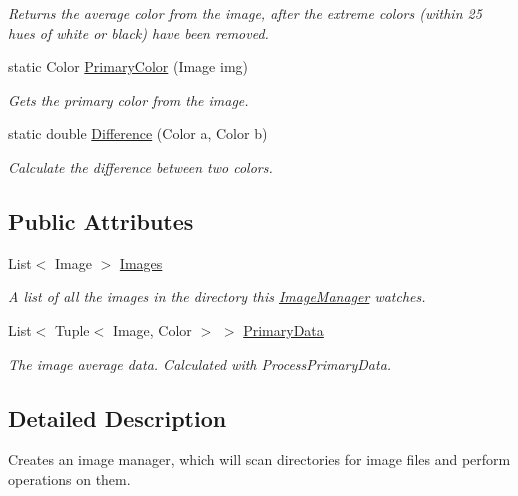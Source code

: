 \begin{DoxyCompactItemize}
\begin{DoxyCompactList}\small\item\em Returns the average color from the image, after the extreme colors (within 25 hues of white or black) have been removed. \end{DoxyCompactList}\item 
static Color \hyperlink{classHumDrum_1_1Operations_1_1ImageManager_acc77118c74c1ff76ba55ffeb0f98121d}{Primary\+Color} (Image img)
\begin{DoxyCompactList}\small\item\em Gets the primary color from the image. \end{DoxyCompactList}\item 
static double \hyperlink{classHumDrum_1_1Operations_1_1ImageManager_a467a48111a335755aac1bf2cc3a7dc55}{Difference} (Color a, Color b)
\begin{DoxyCompactList}\small\item\em Calculate the difference between two colors. \end{DoxyCompactList}\end{DoxyCompactItemize}
\subsection*{Public Attributes}
\begin{DoxyCompactItemize}
\item 
List$<$ Image $>$ \hyperlink{classHumDrum_1_1Operations_1_1ImageManager_afdbb33849624e6275972a428a110245e}{Images}
\begin{DoxyCompactList}\small\item\em A list of all the images in the directory this \hyperlink{classHumDrum_1_1Operations_1_1ImageManager}{Image\+Manager} watches. \end{DoxyCompactList}\item 
List$<$ Tuple$<$ Image, Color $>$ $>$ \hyperlink{classHumDrum_1_1Operations_1_1ImageManager_ab97884ae2504ef9af7c2ec36f5347b5f}{Primary\+Data}
\begin{DoxyCompactList}\small\item\em The image average data. Calculated with Process\+Primary\+Data. \end{DoxyCompactList}\end{DoxyCompactItemize}


\subsection{Detailed Description}
Creates an image manager, which will scan directories for image files and perform operations on them. 



